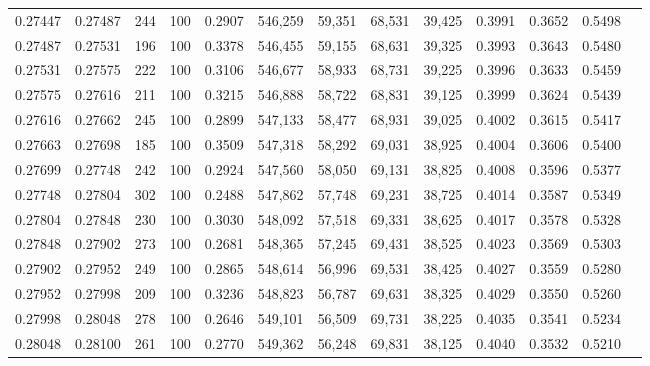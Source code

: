 \begin{tabular}{rrrrrrrrrrrrr}
0.27447 & 0.27487 &   244 & 100 &                                     0.2907 & 546,259 &  59,351 &  68,531 &  39,425 & 0.3991 & 0.3652 & 0.5498 \\
0.27487 & 0.27531 &   196 & 100 &                                     0.3378 & 546,455 &  59,155 &  68,631 &  39,325 & 0.3993 & 0.3643 & 0.5480 \\
0.27531 & 0.27575 &   222 & 100 &                                     0.3106 & 546,677 &  58,933 &  68,731 &  39,225 & 0.3996 & 0.3633 & 0.5459 \\
0.27575 & 0.27616 &   211 & 100 &                                     0.3215 & 546,888 &  58,722 &  68,831 &  39,125 & 0.3999 & 0.3624 & 0.5439 \\
0.27616 & 0.27662 &   245 & 100 &                                     0.2899 & 547,133 &  58,477 &  68,931 &  39,025 & 0.4002 & 0.3615 & 0.5417 \\
0.27663 & 0.27698 &   185 & 100 &                                     0.3509 & 547,318 &  58,292 &  69,031 &  38,925 & 0.4004 & 0.3606 & 0.5400 \\
0.27699 & 0.27748 &   242 & 100 &                                     0.2924 & 547,560 &  58,050 &  69,131 &  38,825 & 0.4008 & 0.3596 & 0.5377 \\
0.27748 & 0.27804 &   302 & 100 &                                     0.2488 & 547,862 &  57,748 &  69,231 &  38,725 & 0.4014 & 0.3587 & 0.5349 \\
0.27804 & 0.27848 &   230 & 100 &                                     0.3030 & 548,092 &  57,518 &  69,331 &  38,625 & 0.4017 & 0.3578 & 0.5328 \\
0.27848 & 0.27902 &   273 & 100 &                                     0.2681 & 548,365 &  57,245 &  69,431 &  38,525 & 0.4023 & 0.3569 & 0.5303 \\
0.27902 & 0.27952 &   249 & 100 &                                     0.2865 & 548,614 &  56,996 &  69,531 &  38,425 & 0.4027 & 0.3559 & 0.5280 \\
0.27952 & 0.27998 &   209 & 100 &                                     0.3236 & 548,823 &  56,787 &  69,631 &  38,325 & 0.4029 & 0.3550 & 0.5260 \\
0.27998 & 0.28048 &   278 & 100 &                                     0.2646 & 549,101 &  56,509 &  69,731 &  38,225 & 0.4035 & 0.3541 & 0.5234 \\
0.28048 & 0.28100 &   261 & 100 &                                     0.2770 & 549,362 &  56,248 &  69,831 &  38,125 & 0.4040 & 0.3532 & 0.5210 \\

\end{tabular}
